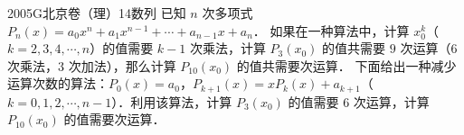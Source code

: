 
\begin{problem}{2005}{G}{北京卷（理）}{14}{数列}
已知 $ n $ 次多项式 $ P_n(x)=a_0x^n+a_1x^{n-1}+\cdots+a_{n-1}x+a_n $．  
如果在一种算法中，计算 $ x_0^k $（$ k=2,3,4,\cdots,n $）的值需要 $ k-1 $ 次乘法，计算 $ P_3(x_0) $ 的值共需要 $ 9 $ 次运算（$ 6 $ 次乘法，$ 3 $ 次加法），那么计算 $ P_{10}(x_0) $ 的值共需要\underline{\hspace{4em}}次运算．  
下面给出一种减少运算次数的算法：$ P_0(x)=a_0 $，$ P_{k+1}(x)=xP_k(x)+a_{k+1} $（$ k=0,1,2,\cdots,n-1 $）．利用该算法，计算 $ P_3(x_0) $ 的值需要 $ 6 $ 次运算，计算 $ P_{10}(x_0) $ 的值需要\underline{\hspace{4em}}次运算．
\end{problem}

\begin{answer}

\end{answer}

\begin{solutions}

\end{solutions}